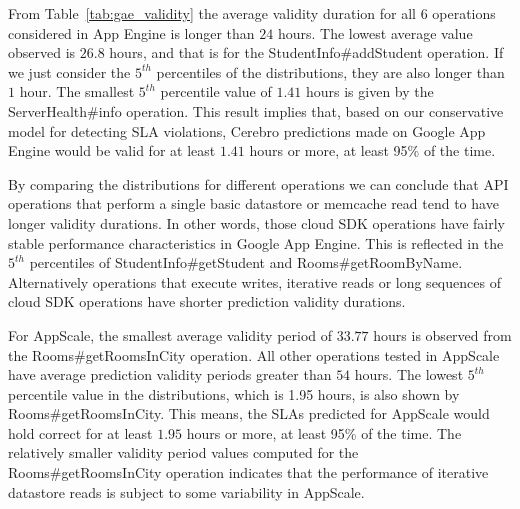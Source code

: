 
From Table~\ref{tab:gae_validity} 
the average validity duration for all 6 operations considered in App Engine is
longer than $24$ hours. The lowest average value observed is $26.8$ hours, 
and that is for the StudentInfo\#addStudent operation. If we
just consider the $5^{th}$ percentiles of the distributions, they are 
also longer than $1$ hour. The smallest $5^{th}$ percentile value of 
$1.41$ hours is 
given by the ServerHealth\#info operation. This result implies that, based on
our conservative model for detecting SLA violations,
Cerebro predictions made on Google App Engine would be valid for at least
$1.41$ hours or more, at least 95\% of the time.

By comparing the distributions for different operations we can conclude that
API operations that perform a single basic datastore or memcache read tend to
have longer validity durations. In other words, those cloud SDK operations have
fairly stable performance characteristics in Google App Engine. 
This is reflected in
the $5^{th}$ percentiles of StudentInfo\#getStudent and Rooms\#getRoomByName. 
Alternatively
operations that execute writes, iterative reads or long sequences of cloud SDK
operations have shorter prediction validity durations.

For AppScale, 
the smallest average validity period of $33.77$ hours is observed from the
Rooms\#getRoomsInCity operation. All other operations tested in 
AppScale have average prediction validity periods greater
than $54$ hours. The lowest $5^{th}$ percentile value in the 
distributions, which is 1.95 hours, is 
also shown by Rooms\#getRoomsInCity. This means, the SLAs predicted for
AppScale would hold correct for at least $1.95$ hours or more, 
at least 95\% of the time.
The relatively smaller validity period values computed for the
Rooms\#getRoomsInCity operation indicates that the performance of 
iterative datastore reads is subject to some variability 
in AppScale.

